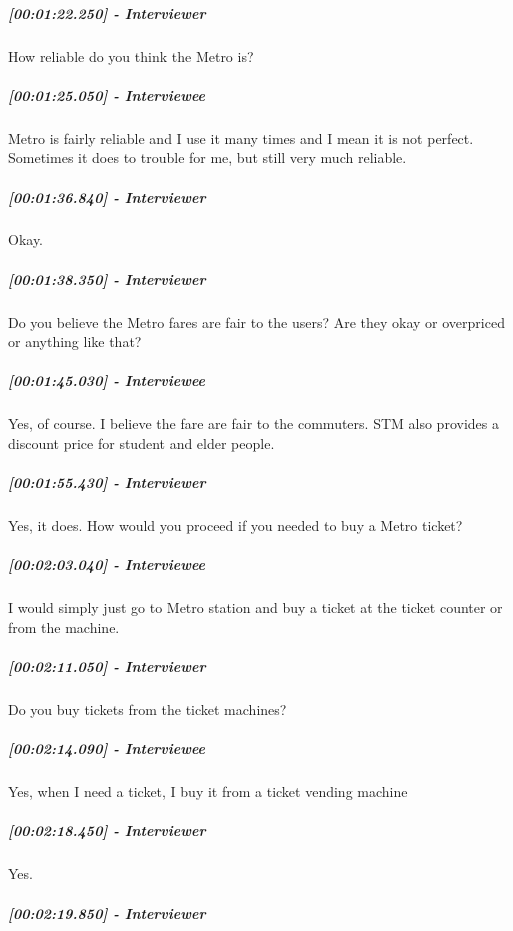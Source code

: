 \documentclass[a4paper,12pt]{article}
\begin{document}
\hypertarget{interviewer-7}{%
\subparagraph{{[}00:01:22.250{]} - Interviewer}\label{interviewer-7}}

How reliable do you think the Metro is?

\hypertarget{interviewee-6}{%
\subparagraph{{[}00:01:25.050{]} - Interviewee}\label{interviewee-6}}

Metro is fairly reliable and I use it many times and I mean it is not
perfect. Sometimes it does to trouble for me, but still very much
reliable.

\hypertarget{interviewer-8}{%
\subparagraph{{[}00:01:36.840{]} - Interviewer}\label{interviewer-8}}

Okay.

\hypertarget{interviewer-9}{%
\subparagraph{{[}00:01:38.350{]} - Interviewer}\label{interviewer-9}}

Do you believe the Metro fares are fair to the users? Are they okay or
overpriced or anything like that?

\hypertarget{interviewee-7}{%
\subparagraph{{[}00:01:45.030{]} - Interviewee}\label{interviewee-7}}

Yes, of course. I believe the fare are fair to the commuters. STM also
provides a discount price for student and elder people.

\hypertarget{interviewer-10}{%
\subparagraph{{[}00:01:55.430{]} - Interviewer}\label{interviewer-10}}

Yes, it does. How would you proceed if you needed to buy a Metro ticket?

\hypertarget{interviewee-8}{%
\subparagraph{{[}00:02:03.040{]} - Interviewee}\label{interviewee-8}}

I would simply just go to Metro station and buy a ticket at the ticket
counter or from the machine.

\hypertarget{interviewer-11}{%
\subparagraph{{[}00:02:11.050{]} - Interviewer}\label{interviewer-11}}

Do you buy tickets from the ticket machines?

\hypertarget{interviewee-9}{%
\subparagraph{{[}00:02:14.090{]} - Interviewee}\label{interviewee-9}}

Yes, when I need a ticket, I buy it from a ticket vending machine

\hypertarget{interviewer-12}{%
\subparagraph{{[}00:02:18.450{]} - Interviewer}\label{interviewer-12}}

Yes.

\hypertarget{interviewer-13}{%
\subparagraph{{[}00:02:19.850{]} - Interviewer}\label{interviewer-13}}
\end{document}
